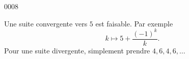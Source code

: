 
\begin{corrige}{0008}

Une suite convergente vers $5$ est faisable. Par exemple
\begin{equation}
	k\mapsto 5+\frac{ (-1)^k }{ k }.
\end{equation}
Pour une suite divergente, simplement prendre $4,6,4,6,\ldots$

\end{corrige}
